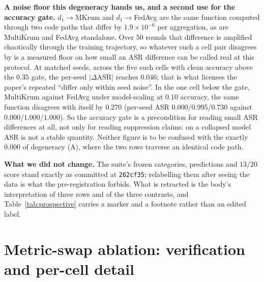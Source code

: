 \documentclass{article}
\begin{document}
\textbf{A noise floor this degeneracy hands us, and a second use for the accuracy gate.} $d_1{\to}$MKrum and $d_1{\to}$FedAvg are the same function computed through two code paths that differ by $1.9\times10^{-6}$ per aggregation, as are MultiKrum and FedAvg standalone. Over $50$ rounds that difference is amplified chaotically through the training trajectory, so whatever such a cell pair disagrees by is a measured floor on how small an ASR difference can be called real at this protocol. At matched seeds, across the five such cells with clean accuracy above the $0.35$ gate, the per-seed $|\Delta\mathrm{ASR}|$ reaches $0.046$; that is what licenses the paper's repeated ``differ only within seed noise''. In the one cell below the gate, MultiKrum against FedAvg under model-scaling at $0.10$ accuracy, the same function disagrees with itself by $0.270$ (per-seed ASR $0.000/0.995/0.730$ against $0.000/1.000/1.000$). So the accuracy gate is a precondition for reading small ASR differences at all, not only for reading suppression claims: on a collapsed model ASR is not a stable quantity. Neither figure is to be confused with the exactly $0.000$ of degeneracy (A), where the two rows traverse an identical code path.

\textbf{What we did not change.} The suite's frozen categories, predictions and $13/20$ score stand exactly as committed at \texttt{262cf35}; relabelling them after seeing the data is what the pre-registration forbids. What is retracted is the body's interpretation of three rows and of the three contrasts, and Table~\ref{tab:prospective} carries a marker and a footnote rather than an edited label.

\section{Metric-swap ablation: verification and per-cell detail}
\label{app:metric_swap_detail}
\end{document}
